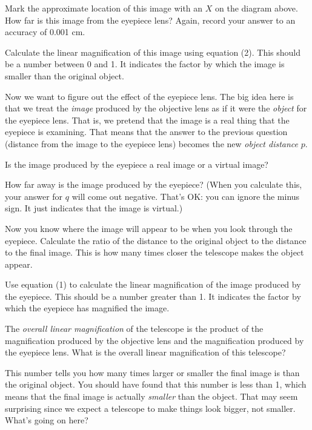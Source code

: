 \answerspace{1in}

Mark the approximate location of this image with an $X$ on the diagram
above.
How far is this image from the eyepiece lens?  Again, record your answer
to an accuracy of 0.001 cm.

\answerspace{1in}

Calculate the linear magnification of this image using equation (2).
This should be a number between 0 and 1.  It indicates the factor
by which the image is smaller than the original object.

\answerspace{1in}


Now we want to figure out the effect of the eyepiece lens.  The big
idea here is that we treat the {\it image} produced by the objective
lens as if it were the {\it object} for the eyepiece lens.  That is,
we pretend that the image is a real thing that the eyepiece is examining.
That means that the answer to the previous question (distance
from the image to the eyepiece lens) becomes the new {\it object distance}
$p$.

Is the image produced by the eyepiece a real image or a virtual image?

\answerspace{1in}

How far away is the image produced by the eyepiece?
(When you calculate this, your answer for $q$ will come out negative.
That's OK: you can ignore the minus sign.  It just indicates that
the image is virtual.)

\answerspace{1in}

Now you know where the image will appear to be when you look through
the eyepiece.  Calculate the ratio of the distance to the original
object to the distance to the final image.  This is how many
times closer the telescope makes the object appear.

\answerspace{1in}

Use equation (1) to calculate the linear magnification of the image produced by 
the eyepiece.  This should be a number greater than 1.  It indicates
the factor by which the eyepiece has magnified the image.

\answerspace{1in}

The {\it overall linear magnification} of the telescope is the product
of the magnification produced by the objective lens and the magnification
produced by the eyepiece lens.  What is the overall 
linear magnification of this
telescope?

\answerspace{1in}

This number tells you how many times larger or smaller the final image
is than the original object.  
You should have found that this number is less than 1, which means
that the final image is actually {\it smaller} than the object.
That may seem surprising since we expect a telescope to make
things look bigger, not smaller.  What's going on here?

